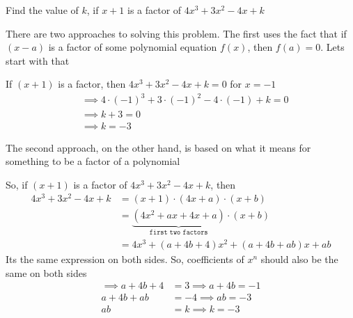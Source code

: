 

\question[2]  Find the value of $k$, if $x+1$ is a factor of $4x^3+3x^2-4x+k$

\ifprintanswers
\fi 

\begin{solution}[\mcq]
	There are two approaches to solving this problem. The first uses the fact
	that if $(x-a)$ is a factor of some polynomial equation $f(x)$, then $f(a) = 0$.
	Lets start with that
	
	If $(x+1)$ is a factor, then $4x^3+3x^2-4x+k = 0 $ for $x = -1$
	\begin{align}
		& \implies 4\cdot(-1)^3+3\cdot(-1)^2-4\cdot(-1)+k = 0 \\
		& \implies k + 3 = 0 \\
		& \implies k = -3
	\end{align}
	
	The second approach, on the other hand, is based on what it means for something  
	to be a factor of a polynomial
	
	So, if $(x+1)$ is a factor of $4x^3+3x^2-4x+k$, then 
	\begin{align}
		4x^3+3x^2-4x+k &= (x+1)\cdot(4x+a)\cdot(x+b) \\
					   &= \underbrace{(4x^2+ax+4x+a)}_\texttt{first two factors}\cdot(x+b) \\
					   &= 4x^3+(a+4b+4)x^2+(a+4b+ab)x+ab
	\end{align}	 
	Its the same expression on both sides. So, coefficients of $x^n$ should also be 
  the same on both sides
	\begin{align}
		\implies a+4b+4 &= 3 \implies a + 4b = -1\\
		            a+4b+ab &= -4 \implies ab = -3\\
		            ab &= k \implies k = -3
	\end{align}
	
\end{solution}
\ifprintanswers\begin{codex}\end{codex}\fi
